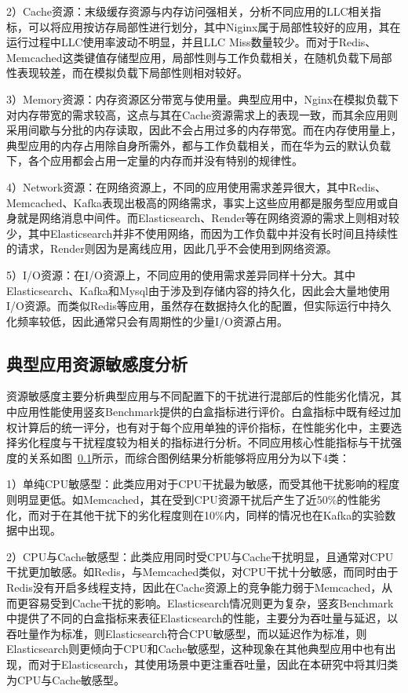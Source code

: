2）Cache资源：末级缓存资源与内存访问强相关，分析不同应用的LLC相关指标，可以将应用按访存局部性进行划分，其中Niginx属于局部性较好的应用，其在运行过程中LLC使用率波动不明显，并且LLC Miss数量较少。而对于Redis、Memcached这类键值存储型应用，局部性则与工作负载相关，在随机负载下局部性表现较差，而在模拟负载下局部性则相对较好。

3）Memory资源：内存资源区分带宽与使用量。典型应用中，Nginx在模拟负载下对内存带宽的需求较高，这点与其在Cache资源需求上的表现一致，而其余应用则采用间歇与分批的内存读取，因此不会占用过多的内存带宽。而在内存使用量上，典型应用的内存占用除自身所需外，都与工作负载相关，而在华为云的默认负载下，各个应用都会占用一定量的内存而并没有特别的规律性。

4）Network资源：在网络资源上，不同的应用使用需求差异很大，其中Redis、Memcached、Kafka表现出极高的网络需求，事实上这些应用都是服务型应用或自身就是网络消息中间件。而Elasticsearch、Render等在网络资源的需求上则相对较少，其中Elasticsearch并非不使用网络，而因为工作负载中并没有长时间且持续性的请求，Render则因为是离线应用，因此几乎不会使用到网络资源。

5）I/O资源：在I/O资源上，不同应用的使用需求差异同样十分大。其中Elasticsearch、Kafka和Mysql由于涉及到存储内容的持久化，因此会大量地使用I/O资源。而类似Redis等应用，虽然存在数据持久化的配置，但实际运行中持久化频率较低，因此通常只会有周期性的少量I/O资源占用。

\subsection{典型应用资源敏感度分析}

资源敏感度主要分析典型应用与不同配置下的干扰进行混部后的性能劣化情况，其中应用性能使用竖亥Benchmark提供的白盒指标进行评价。白盒指标中既有经过加权计算后的统一评分，也有对于每个应用单独的评价指标，在性能劣化中，主要选择劣化程度与干扰程度较为相关的指标进行分析。不同应用核心性能指标与干扰强度的关系如图~\ref{}所示，而综合图例结果分析能够将应用分为以下4类：

1）单纯CPU敏感型：此类应用对于CPU干扰最为敏感，而受其他干扰影响的程度则明显更低。如Memcached，其在受到CPU资源干扰后产生了近50\%的性能劣化，而对于在其他干扰下的劣化程度则在10\%内，同样的情况也在Kafka的实验数据中出现。

2）CPU与Cache敏感型：此类应用同时受CPU与Cache干扰明显，且通常对CPU干扰更加敏感。如Redis，与Memcached类似，对CPU干扰十分敏感，而同时由于Redis没有开启多线程支持，因此在Cache资源上的竞争能力弱于Memcached，从而更容易受到Cache干扰的影响。Elasticsearch情况则更为复杂，竖亥Benchmark中提供了不同的白盒指标来表征Elasticsearch的性能，主要分为吞吐量与延迟，以吞吐量作为标准，则Elasticsearch符合CPU敏感型，而以延迟作为标准，则Elasticsearch则更倾向于CPU和Cache敏感型，这种现象在其他典型应用中也有出现，而对于Elasticsearch，其使用场景中更注重吞吐量，因此在本研究中将其归类为CPU与Cache敏感型。

